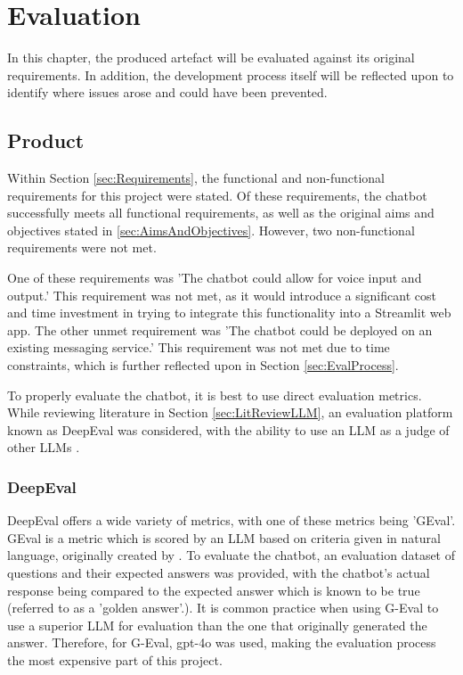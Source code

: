 \chapter{Evaluation}\label{ch:Evaluation}
In this chapter, the produced artefact will be evaluated against its original requirements.
In addition, the development process itself will be reflected upon to identify where issues arose 
and could have been prevented.

\section{Product}
Within Section \ref{sec:Requirements}, the functional and non-functional requirements for this project were stated.
Of these requirements, the chatbot successfully meets all functional requirements, as well as the original aims and 
objectives stated in \ref{sec:AimsAndObjectives}. However, two non-functional requirements were not met.

\para One of these requirements was 'The chatbot could allow for voice input and output.' This requirement was not met,
as it would introduce a significant cost and time investment in trying to integrate this functionality into a Streamlit 
web app. The other unmet requirement was 'The chatbot could be deployed on an existing messaging service.' This requirement 
was not met due to time constraints, which is further reflected upon in Section \ref{sec:EvalProcess}. 

\para To properly evaluate the chatbot, it is best to use direct evaluation metrics. While reviewing literature in Section 
\ref{sec:LitReviewLLM}, an evaluation platform known as DeepEval was considered, with the ability to use an LLM as a judge of 
other LLMs \autocite{deepeval_introduction_2024}.

\subsection{DeepEval}
DeepEval offers a wide variety of metrics, with one of these metrics being 'GEval'. GEval is a metric which is scored by an LLM based 
on criteria given in natural language, originally created by \textcite{liuGEvalNLGEvaluation2023a}. 
To evaluate the chatbot, an evaluation dataset of questions and their expected answers was provided, with the chatbot's actual response being
compared to the expected answer which is known to be true (referred to as a 'golden answer'.). It is common practice when using G-Eval to use a 
superior LLM for evaluation than the one that originally generated the answer. Therefore, for G-Eval, gpt-4o was used, making the evaluation process 
the most expensive part of this project. 

